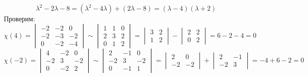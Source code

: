 $$ \lambda^2 - 2\lambda - 8 = (\lambda^2 - 4\lambda) + (2\lambda - 8) = (\lambda - 4)(\lambda + 2) $$
Проверим:
$$ \chi(4) =
\begin{vmatrix}
	-2 & -2 & 0 \\
    -2 & -3 & -2 \\
    0 & -2 & -4
\end{vmatrix} \sim
\begin{vmatrix}
	1 & 1 & 0 \\
    2 & 3 & 2 \\
    0 & 1 & 2
\end{vmatrix} =
\begin{vmatrix}
	3 & 2 \\
    1 & 2
\end{vmatrix} -
\begin{vmatrix}
	2 & 2 \\
    0 & 2
\end{vmatrix} = 6 - 2 - 4 = 0 $$
$$ \chi(-2) =
\begin{vmatrix}
	4 & -2 & 0 \\
    -2 & 3 & -2 \\
    0 & -2 & 2
\end{vmatrix} \sim
\begin{vmatrix}
	2 & -1 & 0 \\
    -2 & 3 & -2 \\
    0 & -1 & 1
\end{vmatrix} =
\begin{vmatrix}
	2 & 0 \\
    -2 & -2
\end{vmatrix} +
\begin{vmatrix}
	2 & -1 \\
    -2 & 3
\end{vmatrix} = -4 + 6 - 2 = 0 $$
